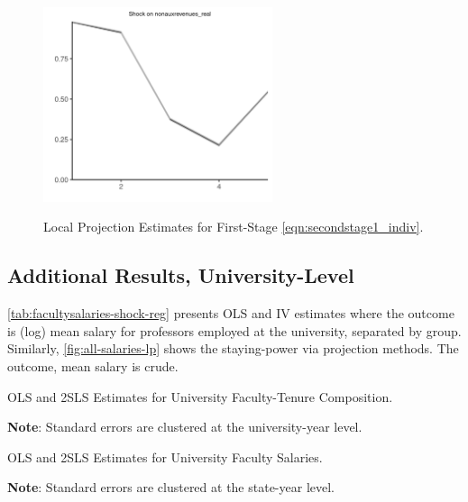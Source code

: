 \documentclass[notitlepage,12pt]{article}
\begin{document}
\begin{figure}[h!]
    \centering
    \caption{Local Projection Estimates for First-Stage \autoref{eqn:secondstage1_indiv}.}
    \includegraphics[width=0.6\textwidth]{figures/firststage-illinois-lp-rolling.png}
    \label{fig:firststage-illinois-lp}
\end{figure}


\subsection{Additional Results, University-Level}

\autoref{tab:facultysalaries-shock-reg} presents OLS and IV estimates where the outcome is (log) mean salary for professors employed at the university, separated by group.
Similarly, \autoref{fig:all-salaries-lp} shows the staying-power via projection methods.
The outcome, mean salary is crude.

\begin{table}[H]
    \onehalfspacing
    \centering
    \caption{OLS and 2SLS Estimates for University Faculty-Tenure Composition.}
    \makebox[\textwidth][c]{}
    \begin{flushleft}
        \footnotesize
        \textbf{Note}: Standard errors are clustered at the university-year level.
    \end{flushleft}
    \label{tab:tenurecount-shock-reg-fte}
\end{table}

\begin{table}[H]
    \onehalfspacing
    \centering
    \caption{OLS and 2SLS Estimates for University Faculty Salaries.}
    \makebox[\textwidth][c]{}
    \begin{flushleft}
        \footnotesize
        \textbf{Note}: Standard errors are clustered at the state-year level.
    \end{flushleft}
    \label{tab:facultysalaries-shock-reg}
\end{table}
\end{document}
